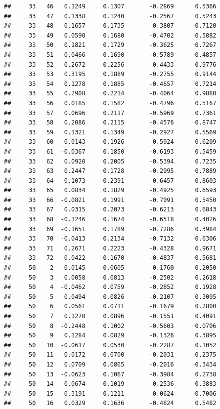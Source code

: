 \documentclass[
]{article}
\begin{document}
\begin{verbatim}
##     33   46   0.1249     0.1307       -0.2869      0.5366  
##     33   47   0.1338     0.1240       -0.2567      0.5243  
##     33   48   0.1657     0.1735       -0.3807      0.7120  
##     33   49   0.0590     0.1680       -0.4702      0.5882  
##     33   50   0.1821     0.1729       -0.3625      0.7267  
##     33   51  -0.0466     0.1690       -0.5789      0.4857  
##     33   52   0.2672     0.2256       -0.4433      0.9776  
##     33   53   0.3195     0.1889       -0.2755      0.9144  
##     33   54   0.1278     0.1885       -0.4657      0.7214  
##     33   55   0.2908     0.2214       -0.4064      0.9880  
##     33   56   0.0185     0.1582       -0.4796      0.5167  
##     33   57   0.0696     0.2117       -0.5969      0.7361  
##     33   58   0.2086     0.2115       -0.4576      0.8747  
##     33   59   0.1321     0.1349       -0.2927      0.5569  
##     33   60   0.0143     0.1926       -0.5924      0.6209  
##     33   61  -0.0367     0.1850       -0.6193      0.5459  
##     33   62   0.0920     0.2005       -0.5394      0.7235  
##     33   63   0.2447     0.1728       -0.2995      0.7889  
##     33   64   0.1073     0.2391       -0.6457      0.8603  
##     33   65   0.0834     0.1829       -0.4925      0.6593  
##     33   66  -0.0821     0.1991       -0.7091      0.5450  
##     33   67   0.0315     0.2073       -0.6213      0.6843  
##     33   68  -0.1246     0.1674       -0.6518      0.4026  
##     33   69  -0.1651     0.1789       -0.7286      0.3984  
##     33   70  -0.0413     0.2134       -0.7132      0.6306  
##     33   71   0.2671     0.2223       -0.4328      0.9671  
##     33   72   0.0422     0.1670       -0.4837      0.5681  
##     50    2   0.0145     0.0605       -0.1760      0.2050  
##     50    3   0.0058     0.0813       -0.2502      0.2618  
##     50    4  -0.0462     0.0759       -0.2852      0.1928  
##     50    5   0.0494     0.0826       -0.2107      0.3095  
##     50    6   0.0561     0.0711       -0.1679      0.2800  
##     50    7   0.1270     0.0896       -0.1551      0.4091  
##     50    8  -0.2448     0.1002       -0.5603      0.0706  
##     50    9   0.1284     0.0829       -0.1326      0.3895  
##     50   10  -0.0617     0.0530       -0.2287      0.1052  
##     50   11   0.0172     0.0700       -0.2031      0.2375  
##     50   12   0.0709     0.0865       -0.2016      0.3434  
##     50   13  -0.0623     0.1067       -0.3984      0.2738  
##     50   14   0.0674     0.1019       -0.2536      0.3883  
##     50   15   0.3191     0.1211       -0.0624      0.7006  
##     50   16   0.0329     0.1636       -0.4824      0.5482  

\end{verbatim}
\end{document}
